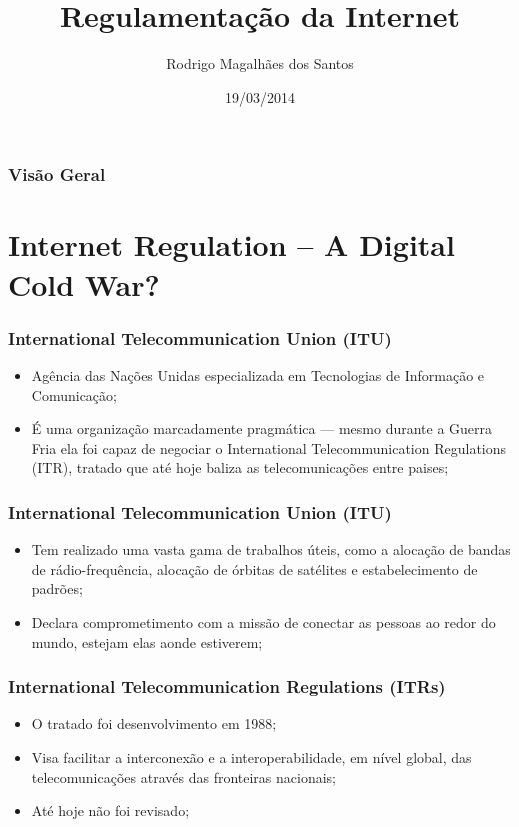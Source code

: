 \documentclass{beamer}
\title[Regulamentação da Internet]{Regulamentação da Internet} %
\author{Rodrigo Magalhães dos Santos} %
\institute[IPT] %
{
Instituto de Pesquisas Tecnológicas \\ Universidade de São Paulo \\ %
\medskip
\textit{rmagalhaes85@gmail.com} %
}
\date{19/03/2014}
\begin{document}
\begin{frame}
\titlepage %
\end{frame}

\begin{frame}
\frametitle{Visão Geral}
\tableofcontents 
\end{frame}


\section{Internet Regulation -- A Digital Cold War?} 

\begin{frame}
\frametitle{International Telecommunication Union (ITU)}
\begin{itemize}
\item Agência das Nações Unidas especializada em Tecnologias de Informação e Comunicação;
\item É uma organização marcadamente pragmática --- mesmo durante a Guerra Fria ela foi capaz de negociar o International Telecommunication Regulations (ITR), tratado que até hoje baliza as telecomunicações entre paises;
\end{itemize}
\end{frame}


\begin{frame}
\frametitle{International Telecommunication Union (ITU)}
\begin{itemize}
\item Tem realizado uma vasta gama de trabalhos úteis, como a alocação  de bandas de rádio-frequência, alocação de órbitas de satélites e estabelecimento de padrões;
\item Declara comprometimento com a missão de conectar as pessoas ao redor do mundo, estejam elas aonde estiverem;
\end{itemize}
\end{frame}


\begin{frame}
\frametitle{International Telecommunication Regulations (ITRs)}
\begin{itemize}
\item O tratado foi desenvolvimento em 1988;
\item Visa facilitar a interconexão e a interoperabilidade, em nível global, das telecomunicações através das fronteiras nacionais;
\item Até hoje não foi revisado;
\end{itemize}
\end{frame}
\end{document}
